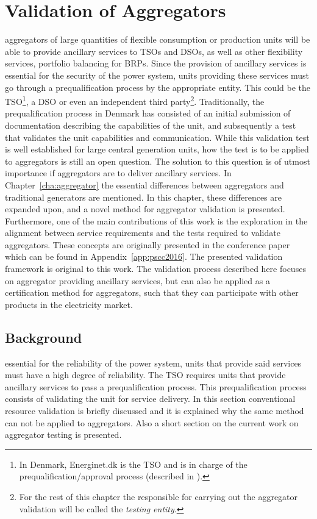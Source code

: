 \chapter{Validation of Aggregators}
\label{cha:validation}
 aggregators of large quantities of flexible consumption or production units will be able to provide ancillary services to TSOs and DSOs, as well as other flexibility services, \eg portfolio balancing for BRPs. Since the provision of ancillary services is essential for the security of the power system, units providing these services must go through a prequalification process by the appropriate entity. This could be the TSO\footnote{In Denmark, Energinet.dk is the TSO and is in charge of the prequalification/approval process (described in \cite{EnerginetAncillary}).}, a DSO or even an independent third party\footnote{For the rest of this chapter the responsible for carrying out the aggregator validation will be called the \emph{testing entity}.}. Traditionally, the prequalification process in Denmark has consisted of an initial submission of documentation describing the capabilities of the unit, and subsequently a test that validates the unit capabilities and communication. While this validation test is well established for large central generation units, how the test is to be applied to aggregators is still an open question. The solution to this question is of utmost importance if aggregators are to deliver ancillary services. In Chapter~\ref{cha:aggregator} the essential differences between aggregators and traditional generators are mentioned. In this chapter, these differences are expanded upon, and a novel method for aggregator validation is presented. Furthermore, one of the main contributions of this work is the exploration in the alignment between service requirements and the tests required to validate aggregators. These concepts are originally presented in the conference paper which can be found in Appendix~\ref{app:pscc2016}. The presented validation framework is original to this work. The validation process described here focuses on aggregator providing ancillary services, but can also be applied as a certification method for aggregators, such that they can participate with other products in the electricity market.

\section{Background}
 essential for the reliability of the power system, units that provide said services must have a high degree of reliability. The TSO requires units that provide ancillary services to pass a prequalification process. This prequalification process consists of validating the unit for service delivery. In this section conventional resource validation is briefly discussed and it is explained why the same method can not be applied to aggregators. Also a short section on the current work on aggregator testing is presented.
